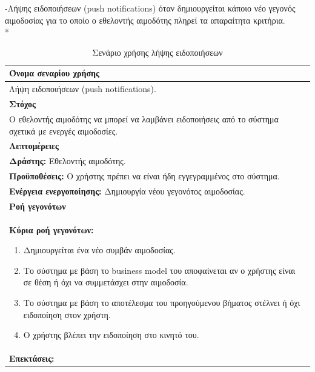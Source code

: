 -Λήψης ειδοποιήσεων (push notifications) όταν δημιουργείται κάποιο νέο γεγονός αιμοδοσίας για το οποίο ο εθελοντής αιμοδότης πληρεί τα απαραίτητα κριτήρια.
\\*
\begin{table}[H]
	\begin{center}
	    \begin{tabular}{|p{\dimexpr \linewidth-2\tabcolsep}|}
	    \hline
	    \rowcolor{grayy}
	    \textbf{Όνομα σεναρίου χρήσης}
	    \\ \hline    
	     Λήψη ειδοποιήσεων (push notifications).
	     \\ \hline
	    \rowcolor{grayy}
	    \textbf{\textbf{Στόχος}}
	    \\ \hline
	 	 Ο εθελοντής αιμοδότης να μπορεί να λαμβάνει ειδοποιήσεις από το σύστημα σχετικά με ενεργές αιμοδοσίες. 
	    \\ \hline
	    \rowcolor{grayy}
	    \textbf{Λεπτομέρειες}
	    \\ \hline
		\textbf{Δράστης:} Εθελοντής αιμοδότης.
		\\*
		\textbf{Προϋποθέσεις:} Ο χρήστης πρέπει να είναι ήδη εγγεγραμμένος στο σύστημα.
		\\*
		\textbf{Ενέργεια ενεργοποίησης:} Δημιουργία νέου γεγονότος αιμοδοσίας.
		\\ \hline
		\rowcolor{grayy}    
	    \textbf{Ροή γεγονότων}
	    \\ \hline
		\textbf{Κύρια ροή γεγονότων:}
		\begin{enumerate}
			\item	Δημιουργείται ένα νέο συμβάν αιμοδοσίας.
			\item Το σύστημα με βάση το business model του αποφαίνεται αν ο χρήστης είναι σε θέση ή όχι να συμμετάσχει στην αιμοδοσία.
			\item Το σύστημα με βάση το αποτέλεσμα του προηγούμενου βήματος στέλνει ή όχι ειδοποίηση στον χρήστη.
			\item Ο χρήστης βλέπει την ειδοποίηση στο κινητό του.
		\end{enumerate}
				\\ \hline
		\textbf{Επεκτάσεις:}
		   \\ \hline
	    \end{tabular}
	    \caption{Σενάριο χρήσης λήψης ειδοποιήσεων}
	    \label{tab:receive_push_notifications} 
	\end{center}
\end{table}

